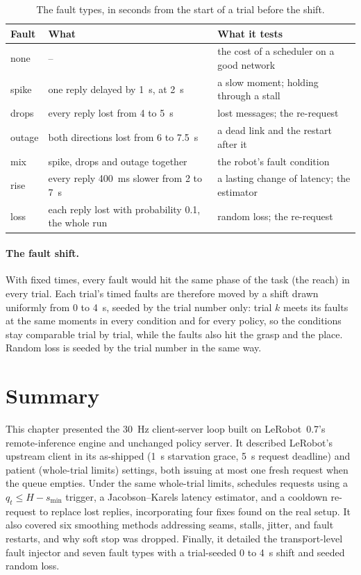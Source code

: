 \begin{table}[htbp]
  \centering
  \small
  \begin{tabularx}{\textwidth}{l X X}
    \toprule
    Fault & What & What it tests \\
    \midrule
    none & -- & the cost of a scheduler on a good network \\
    spike & one reply delayed by 1~s, at 2~s & a slow moment; holding through a stall \\
    drops & every reply lost from 4 to 5~s & lost messages; the re-request \\
    outage & both directions lost from 6 to 7.5~s & a dead link and the restart after it \\
    mix & spike, drops and outage together & the robot's fault condition \\
    rise & every reply 400~ms slower from 2 to 7~s & a lasting change of latency; the estimator \\
    loss & each reply lost with probability 0.1, the whole run & random loss; the re-request \\
    \bottomrule
  \end{tabularx}
  \caption{The fault types, in seconds from the start of a trial before the shift.}\label{tab:faults}
\end{table}

\paragraph{The fault shift.} With fixed times, every fault would hit the same phase of the task (the reach) in every
trial. Each trial's timed faults are therefore moved by a shift drawn uniformly from 0 to 4~s, seeded by the trial
number only: trial $k$ meets its faults at the same moments in every condition and for every policy, so the conditions
stay comparable trial by trial, while the faults also hit the grasp and the place. Random loss is seeded by the trial
number in the same way.




\section{Summary}
This chapter presented the 30~Hz client-server loop built on LeRobot~0.7's remote-inference engine and unchanged policy server. It described LeRobot's upstream client in its as-shipped (1~s starvation grace, 5~s request deadline) and patient (whole-trial limits) settings, both issuing at most one fresh request when the queue empties. Under the same whole-trial limits, \drtc{} schedules requests using a $q_t \le H - s_{\min}$ trigger, a Jacobson--Karels latency estimator, and a cooldown re-request to replace lost replies, incorporating four fixes found on the real setup. It also covered six smoothing methods addressing seams, stalls, jitter, and fault restarts, and why soft stop was dropped. Finally, it detailed the transport-level fault injector and seven fault types with a trial-seeded 0 to 4~s shift and seeded random loss.
